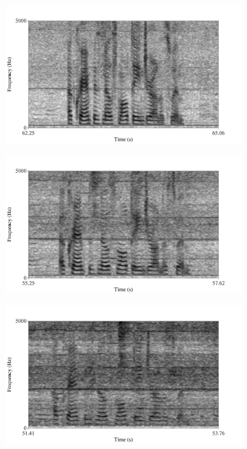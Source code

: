 \begin{figure}[H]
\centering
\begin{subfigure}{0.475\textwidth}
  \centering
  \includegraphics[width=1\linewidth]{figure/spctgrm_cramp_bus_60.png}
  \caption{}
  \label{fig:limitation_bus_60}
\end{subfigure}%
\hfill
\begin{subfigure}{0.475\textwidth}
  \centering
  \includegraphics[width=1\linewidth]{figure/spctgrm_cramp_bus_70.png}
  \caption{}
  \label{fig:limitation_bus_70}
\end{subfigure}
\begin{center}
\begin{subfigure}{0.475\textwidth}
  \centering
  \includegraphics[width=1\linewidth]{figure/spctgrm_cramp_bus_80.png}

\end{subfigure}
\end{center}
\end{figure}
